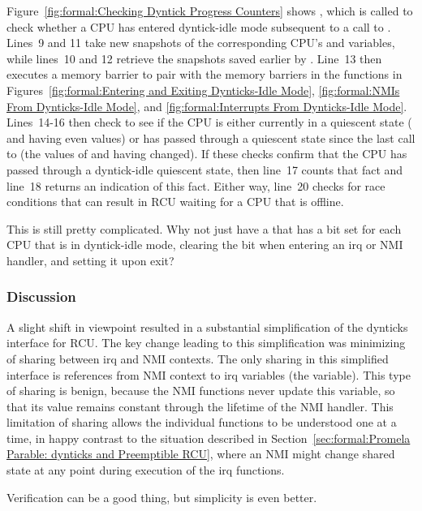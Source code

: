 Figure~\ref{fig:formal:Checking Dyntick Progress Counters}
shows , which is called to check
whether a CPU has entered dyntick-idle mode subsequent to a call
to .
Lines~9 and 11 take new snapshots of the corresponding CPU's
 and  variables, while lines~10 and 12
retrieve the snapshots saved earlier by
.
Line~13 then
executes a memory barrier to pair with the memory barriers in
the functions in
Figures~\ref{fig:formal:Entering and Exiting Dynticks-Idle Mode},
\ref{fig:formal:NMIs From Dynticks-Idle Mode}, and
\ref{fig:formal:Interrupts From Dynticks-Idle Mode}.
Lines~14-16 then check to see if the CPU is either currently in
a quiescent state ( and  having even values) or
has passed through a quiescent state since the last call to
 (the values of
 and  having changed).
If these checks confirm that the CPU has passed through a dyntick-idle
quiescent state, then line~17 counts that fact and line~18 returns
an indication of this fact.
Either way, line~20 checks for race conditions that can result in RCU
waiting for a CPU that is offline.

\QuickQuiz{}
	This is still pretty complicated.
	Why not just have a  that has a bit set for
	each CPU that is in dyntick-idle mode, clearing the bit
	when entering an irq or NMI handler, and setting it upon
	exit?
 \QuickQuizEnd

\subsubsection{Discussion}
\label{sec:formal:Discussion}

A slight shift in viewpoint resulted in a substantial simplification
of the dynticks interface for RCU.
The key change leading to this simplification was minimizing of
sharing between irq and NMI contexts.
The only sharing in this simplified interface is references from NMI
context to irq variables (the  variable).
This type of sharing is benign, because the NMI functions never update
this variable, so that its value remains constant through the lifetime
of the NMI handler.
This limitation of sharing allows the individual functions to be
understood one at a time, in happy contrast to the situation
described in
Section~\ref{sec:formal:Promela Parable: dynticks and Preemptible RCU},
where an NMI might change shared state at any point during execution of
the irq functions.

Verification can be a good thing, but simplicity is even better.
